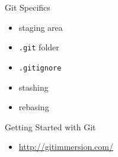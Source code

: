 \documentclass{beamer}
\begin{document}
\begin{frame}{Git Specifics}
  \begin{itemize}
    \item staging area
    \item \texttt{.git} folder
    \item \texttt{.gitignore}
    \item stashing
    \item rebasing
  \end{itemize}
\end{frame}

\begin{frame}{Getting Started with Git}
  \begin{itemize}
    \item \url{http://gitimmersion.com/}
  \end{itemize}
\end{frame}
\end{document}
